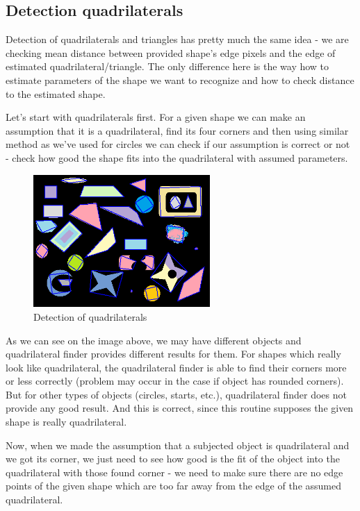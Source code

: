 \subsection{Detection quadrilaterals}
Detection of quadrilaterals and triangles has pretty much the same idea - we are checking mean distance between provided shape's edge pixels and the edge of estimated quadrilateral/triangle. The only difference here is the way how to estimate parameters of the shape we want to recognize and how to check distance to the estimated shape.

Let's start with quadrilaterals first. For a given shape we can make an assumption that it is a quadrilateral, find its four corners and then using similar method as we've used for circles we can check if our assumption is correct or not - check how good the shape fits into the quadrilateral with assumed parameters.
\begin{figure}[H]
\centering
\label{fig:shape} 
\includegraphics[width=0.6\textwidth]{shapefourcorner}
\caption {Detection of quadrilaterals}
\end{figure}
As we can see on the image above, we may have different objects and quadrilateral finder provides different results for them. For shapes which really look like quadrilateral, the quadrilateral finder is able to find their corners more or less correctly (problem may occur in the case if object has rounded corners). But for other types of objects (circles, starts, etc.), quadrilateral finder does not provide any good result. And this is correct, since this routine supposes the given shape is really quadrilateral.

Now, when we made the assumption that a subjected object is quadrilateral and we got its corner, we just need to see how good is the fit of the object into the quadrilateral with those found corner - we need to make sure there are no edge points of the given shape which are too far away from the edge of the assumed quadrilateral.
